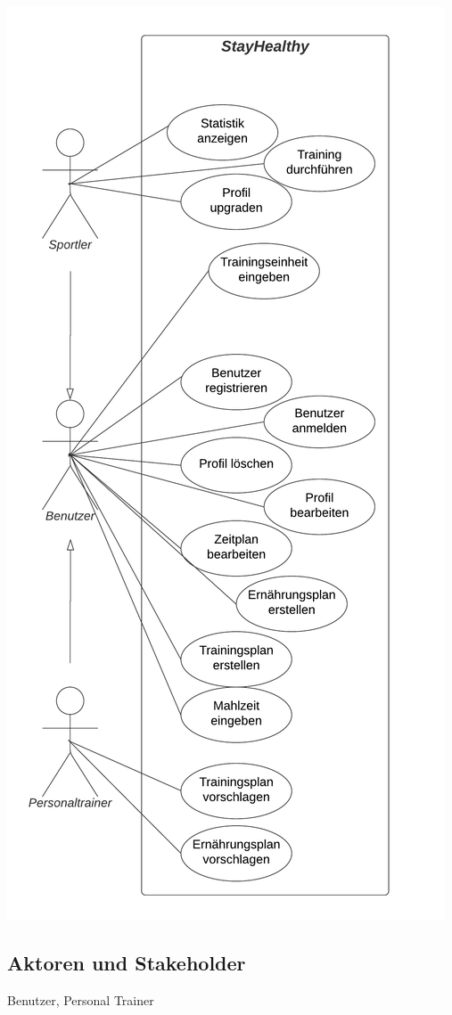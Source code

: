 \documentclass[12pt,a4paper,onecolumn]{article}
\begin{document}
\includegraphics[scale=0.8]{Anwendungsfalldiagramm.png}

\subsection{Aktoren und Stakeholder}
Benutzer, Personal Trainer
\end{document}
